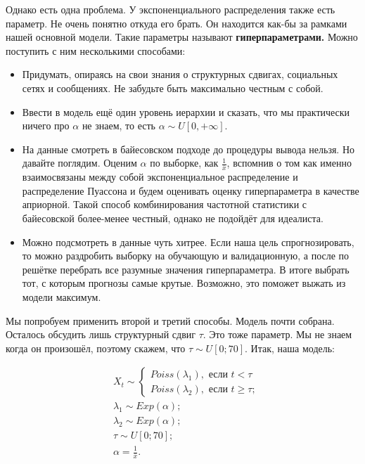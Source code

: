 \documentclass[12pt, a4paper, oneside]{extreport}
\newcommand{\indef}[1]{\textbf{#1}}     %
\theoremstyle{plain}              %
\theoremstyle{definition}         %
\begin{document}
Однако есть одна проблема. У экспоненциального распределения также есть параметр. Не очень понятно откуда его брать. Он находится как-бы за рамками нашей основной модели. Такие параметры называют \indef{гиперпараметрами.}  Можно поступить с ним несколькими способами: 

\begin{itemize}
\item Придумать, опираясь на свои знания о структурных сдвигах, социальных сетях и сообщениях. Не забудьте быть максимально честным с собой.
\item Ввести в модель ещё один уровень иерархии и сказать, что мы практически ничего про $\alpha$ не знаем, то есть  $\alpha \sim U[0, + \infty]$.
\item На данные смотреть в байесовском подходе до процедуры вывода нельзя. Но давайте поглядим. Оценим $\alpha$ по выборке, как $\frac{1}{\bar x}$, вспомнив о том как именно взаимосвязаны между собой экспоненциальное распределение и распределение Пуассона и будем оценивать оценку гиперпараметра в качестве априорной. Такой способ комбинирования частотной статистики с байесовской более-менее честный, однако не подойдёт для идеалиста. 
\item Можно подсмотреть в данные чуть хитрее. Если наша цель спрогнозировать, то можно раздробить выборку на обучающую и валидационную, а после по решётке перебрать все разумные значения гиперпараметра. В итоге выбрать тот, с которым прогнозы самые крутые. Возможно, это поможет выжать из модели максимум. 
\end{itemize}

Мы попробуем применить второй и третий способы. Модель почти собрана. Осталось обсудить лишь структурный сдвиг $\tau$. Это тоже параметр. Мы не знаем когда он произошёл, поэтому скажем, что $\tau \sim U[0;70]$. Итак, наша модель: 

\begin{equation*}
\begin{aligned}
&X_t \sim \begin{cases}  Poiss(\lambda_1), \text{ если } t < \tau \\  Poiss(\lambda_2), \text{ если } t \ge \tau; \end{cases}\\
&\lambda_1 \sim Exp(\alpha); \\
&\lambda_2 \sim Exp(\alpha); \\
&\tau \sim U[0;70]; \\ 
&\alpha = \frac{1}{\bar x}.\\
\end{aligned}
\end{equation*}
\end{document}
